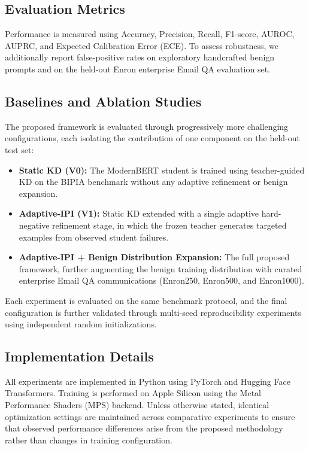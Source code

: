 \documentclass[conference]{IEEEtran}
\begin{document}
\subsection{Evaluation Metrics}

Performance is measured using Accuracy, Precision, Recall, F1-score, AUROC, AUPRC, and Expected Calibration Error (ECE). To assess robustness, we additionally report false-positive rates on exploratory handcrafted benign prompts and on the held-out Enron enterprise Email QA evaluation set.

\subsection{Baselines and Ablation Studies}

The proposed framework is evaluated through progressively more challenging configurations, each isolating the contribution of one component on the held-out test set:
\begin{itemize}
    \item \textbf{Static KD (V0):} The ModernBERT student is trained using teacher-guided KD on the BIPIA benchmark without any adaptive refinement or benign expansion.
    \item \textbf{Adaptive-IPI (V1):} Static KD extended with a single adaptive hard-negative refinement stage, in which the frozen teacher generates targeted examples from observed student failures.
    \item \textbf{Adaptive-IPI + Benign Distribution Expansion:} The full proposed framework, further augmenting the benign training distribution with curated enterprise Email QA communications (Enron250, Enron500, and Enron1000).
\end{itemize}

Each experiment is evaluated on the same benchmark protocol, and the final configuration is further validated through multi-seed reproducibility experiments using independent random initializations.

\subsection{Implementation Details}

All experiments are implemented in Python using PyTorch and Hugging Face Transformers. Training is performed on Apple Silicon using the Metal Performance Shaders (MPS) backend. Unless otherwise stated, identical optimization settings are maintained across comparative experiments to ensure that observed performance differences arise from the proposed methodology rather than changes in training configuration.
\end{document}
